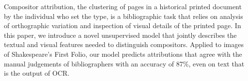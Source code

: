 Compositor attribution, the clustering of pages in a historical printed document by the individual who set the type, is a bibliographic task that relies on analysis of orthographic variation and inspection of visual details of the printed page. In this paper, we introduce a novel unsupervised model that jointly describes the textual and visual features needed to distinguish compositors. Applied to images of Shakespeare's First Folio, our model predicts attributions that agree with the manual judgements of bibliographers with an accuracy of 87\%, even on text that is the output of OCR.

